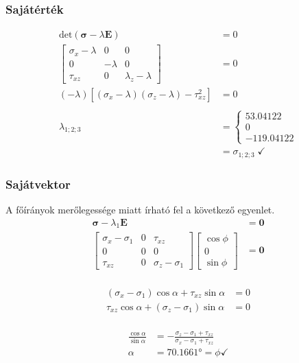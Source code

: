 \subsubsection{Sajátérték}
\begin{align*}
	\text{det}(\pmb{\sigma} - \lambda\pmb{E}) &= 0 \\
	\begin{bmatrix}
		\sigma_x - \lambda & 0 & 0 \\
		0 & -\lambda & 0 \\
		\tau_{xz} & 0 & \lambda_z - \lambda
	\end{bmatrix} &= 0 \\
	(-\lambda)\left[(\sigma_x - \lambda)(\sigma_z - \lambda) - \tau_{xz}^2\right] &= 0 \\ \\
	\lambda_{1;2;3} &= \begin{cases}
		53.04122 \\
		0 \\
		-119.04122
	\end{cases} \\&= \sigma_{1;2;3} \; \checkmark
\end{align*}

\subsubsection{Sajátvektor}
A főírányok merőlegessége miatt írható fel a következő egyenlet.
\begin{align*}
	\pmb{\sigma} - \lambda_1 \pmb{E} &= \pmb{0} \\
	\begin{bmatrix}
		\sigma_x - \sigma_1 & 0 & \tau_{xz} \\
		0 & 0 & 0 \\
		\tau_{xz} & 0 & \sigma_z - \sigma_1 
	\end{bmatrix} \begin{bmatrix}
		\cos \phi \\
		0 \\
		\sin \phi
	\end{bmatrix} &= \pmb{0} \\
\end{align*}

\begin{align*}
	(\sigma_x - \sigma_1)\cos \alpha + \tau_{xz} \sin \alpha &= 0 \\
	 \tau_{xz} \cos \alpha + (\sigma_z - \sigma_1)\sin \alpha &= 0 \\
\end{align*}

\begin{align*}
	 \frac{\cos \alpha}{\sin \alpha} &= -\frac{\sigma_z - \sigma_1 + \tau_{xz}}{\sigma_x - \sigma_1 + \tau_{xz}} \\
	 \alpha &= \ang{70.1661} = \phi \checkmark
\end{align*}

